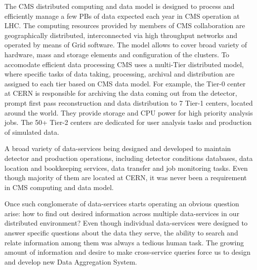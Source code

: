 \documentclass[1p,times]{elsarticle}
\begin{document}
The CMS distributed computing and data model \cite{CMSDataModel} 
is designed to process
and efficiently manage a few PBs of data expected each year
in CMS operation at LHC. The computing resources provided by members of CMS
collaboration are geographically distributed, 
interconnected via high throughput networks and operated by means 
of Grid software. The model allows to cover broad variety of
hardware, mass and storage elements and configuration of the
clusters. To accomodate efficient data processing CMS uses
a multi-Tier distributed model, where specific tasks of data taking,
processing, archival and distribution are assigned to each tier based
on CMS data model. For example, the Tier-0 center at CERN is responsible
for archiving the data coming out from the detector, prompt first pass reconstruction
and data distribution to 7 Tier-1 centers, located around the world.
They provide storage and CPU power for high priority analysis jobs.
The 50+ Tier-2 centers
are dedicated for user analysis tasks and production of simulated data.

A broad variety of data-services being designed and developed to
maintain detector and production operations, including detector
conditions databases, data location and bookkeeping services,
data transfer and job monitoring tasks. Even though majority of them
are located at CERN, it was never been a requirement in CMS computing
and data model. 

Once such conglomerate of data-services starts operating an obvious
question arise: how to find out desired information across multiple data-services
in our distributed environment? Even though individual data-services were designed
to answer specific questions about the data they serve, the ability to search and relate
information among them was always a tedious human task. The growing amount of information
and desire to make cross-service queries force us to design and develop new
Data Aggregation System.
\end{document}
